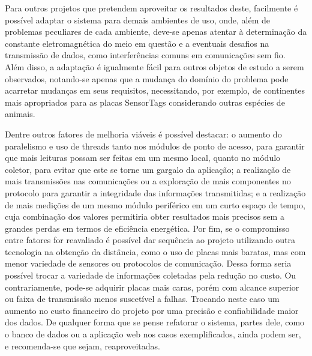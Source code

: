 Para outros projetos que pretendem aproveitar os resultados deste, facilmente é possível adaptar o sistema para demais ambientes de uso, onde, além de problemas peculiares de cada ambiente, deve-se apenas atentar à determinação da constante eletromagnética do meio em questão e a eventuais desafios na transmissão de dados, como interferências comuns em comunicações sem fio. Além disso, a adaptação é igualmente fácil para outros objetos de estudo a serem observados, notando-se apenas que a mudança do domínio do problema pode acarretar mudanças em seus requisitos, necessitando, por exemplo, de continentes mais apropriados para as placas SensorTags considerando outras espécies de animais.

Dentre outros fatores de melhoria viáveis é possível destacar: o aumento do paralelismo e uso de threads tanto nos módulos de ponto de acesso, para garantir que mais leituras possam ser feitas em um mesmo local, quanto no módulo coletor, para evitar que este se torne um gargalo da aplicação; a realização de mais transmissões nas comunicações ou a exploração de mais componentes no protocolo para garantir a integridade das informações transmitidas; e a realização de mais medições de um mesmo módulo periférico em um curto espaço de tempo, cuja combinação dos valores permitiria obter resultados mais precisos sem a grandes perdas em termos de eficiência energética.
Por fim, se o compromisso entre fatores for reavaliado é possível dar sequência ao projeto utilizando outra tecnologia na obtenção da distância, como o uso de placas mais baratas, mas com menor variedade de sensores ou protocolos de comunicação. Dessa forma seria possível trocar a variedade de informações coletadas pela redução no custo. Ou contrariamente, pode-se adquirir placas mais caras, porém com alcance superior ou faixa de transmissão menos suscetível a falhas. Trocando neste caso um aumento no custo financeiro do projeto por uma precisão e confiabilidade maior dos dados. De qualquer forma que se pense refatorar o sistema, partes dele, como o banco de dados ou a aplicação web nos casos exemplificados, ainda podem ser, e recomenda-se que sejam, reaproveitadas.
